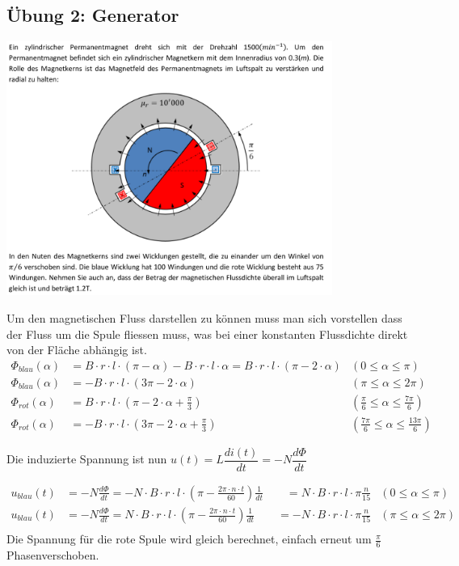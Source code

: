 \subsection{Übung 2: Generator}

\includegraphics[width = 0.8\textwidth]{bilder/a21.png}

Um den magnetischen Fluss darstellen zu können muss man sich vorstellen dass der Fluss um die Spule fliessen muss, was bei einer konstanten Flussdichte direkt von der Fläche abhängig ist.
\begin{align*}
	\Phi_{blau}(\alpha) &= B \cdot r\cdot  l \cdot (\pi - \alpha) -  B\cdot r\cdot l\cdot \alpha = B \cdot r\cdot  l \cdot (\pi - 2\cdot \alpha) &(0\leq \alpha \leq \pi)\\
	\Phi_{blau}(\alpha) &=  -B \cdot r\cdot  l \cdot (3\pi - 2\cdot \alpha) &(\pi\leq \alpha \leq 2\pi)\\
	\Phi_{rot}(\alpha) &= B \cdot r\cdot  l \cdot (\pi - 2\cdot \alpha+\frac{\pi}{3}) &(\frac{\pi}{6}\leq \alpha \leq \frac{7\pi}{6})\\
	\Phi_{rot}(\alpha) &= -B \cdot r\cdot  l \cdot (3\pi - 2\cdot \alpha+\frac{\pi}{3}) &(\frac{7\pi}{6}\leq \alpha \leq \frac{13\pi}{6})
\end{align*}
	
Die induzierte Spannung ist nun $u(t) = L\dfrac{di(t)}{dt} = -N\dfrac{d\Phi}{dt}$

\begin{align*}
	u_{blau}(t) &= -N\frac{d\Phi}{dt} = -N\cdot B \cdot r  \cdot l\cdot \left(\pi - \frac{2 \pi\cdot n \cdot t}{60} \right) \frac{1}{dt}\qquad = N\cdot B \cdot r\cdot l \cdot \pi \frac{n}{15} &(0\leq \alpha \leq \pi)\\
	u_{blau}(t) &= -N\frac{d\Phi}{dt} = N\cdot B \cdot r  \cdot l\cdot \left(\pi - \frac{2 \pi\cdot n \cdot t}{60} \right) \frac{1}{dt}\qquad = -N\cdot B \cdot r\cdot l \cdot \pi \frac{n}{15} &(\pi\leq \alpha \leq 2\pi)\\
\end{align*}
Die Spannung für die rote Spule wird gleich berechnet, einfach erneut um $\frac{\pi}{6}$ Phasenverschoben.

